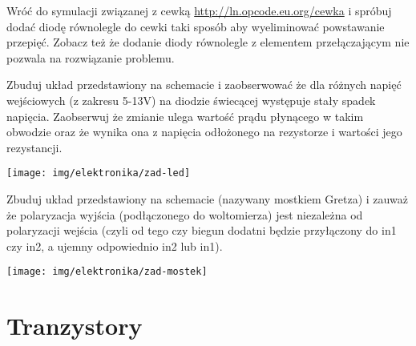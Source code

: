\documentclass{pdfBooklets}
\begin{document}
\begin{Zadanie}{}{}
Wróć do symulacji związanej z cewką \url{http://ln.opcode.eu.org/cewka} i spróbuj dodać diodę równolegle do cewki taki sposób aby wyeliminować powstawanie przepięć.
Zobacz też że dodanie diody równolegle z elementem przełączającym nie pozwala na rozwiązanie problemu.
\end{Zadanie}

\begin{Zadanie}{}{}
\noindent\begin{minipage}[b]{0.7\textwidth}
Zbuduj układ przedstawiony na schemacie i zaobserwować że dla różnych napięć wejściowych (z zakresu 5-13V) na diodzie świecącej występuje stały spadek napięcia.
Zaobserwuj że zmianie ulega wartość prądu płynącego w takim obwodzie oraz że wynika ona z napięcia odłożonego na rezystorze i wartości jego rezystancji.
\end{minipage}
\hfill
\begin{minipage}[b]{0.25\textwidth}
\texttt{[image: img/elektronika/zad-led]}\vspace{0.5cm}
\end{minipage}
\end{Zadanie}

\begin{Zadanie}{}{}
\noindent\begin{minipage}[b]{0.6\textwidth}
Zbuduj układ przedstawiony na schemacie (nazywany mostkiem Gretza) i zauważ że polaryzacja wyjścia (podłączonego do woltomierza) jest niezależna od polaryzacji wejścia (czyli od tego czy biegun dodatni będzie przyłączony do in1 czy in2, a ujemny odpowiednio in2 lub in1).
\end{minipage}
\hfill
\begin{minipage}[b]{0.35\textwidth}
\texttt{[image: img/elektronika/zad-mostek]}
\end{minipage}
\end{Zadanie}

\section{Tranzystory}
\end{document}
